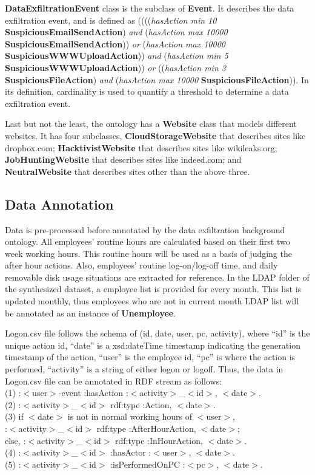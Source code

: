 \textbf{DataExfiltrationEvent} class is the subclass of \textbf{Event}. 
It describes the data exfiltration event, and is defined as ((((\textit{hasAction min 10} \textbf{SuspiciousEmailSendAction}) \textit{and} (\textit{hasAction max 10000} \textbf{SuspiciousEmailSendAction})) \textit{or} (\textit{hasAction max 10000} \textbf{SuspiciousWWWUploadAction})) \textit{and} (\textit{hasAction min 5} \textbf{SuspiciousWWWUploadAction})) \textit{or} ((\textit{hasAction min 3} \textbf{SuspiciousFileAction}) \textit{and} (\textit{hasAction max 10000} \textbf{SuspiciousFileAction})).
In its definition, cardinality is used to quantify a threshold to determine a data exfiltration event.

Last but not the least, the ontology has a \textbf{Website} class that models different websites. 
It has four subclasses, \textbf{CloudStorageWebsite} that describes sites like dropbox.com; 
\textbf{HacktivistWebsite} that describes sites like wikileaks.org;
\textbf{JobHuntingWebsite} that describes sites like indeed.com;
and \textbf{NeutralWebsite} that describes sites other than the above three. 

\subsection{Data Annotation}
Data is pre-processed before annotated by the data exfiltration background ontology. 
All employees' routine hours are calculated based on their first two week working hours. 
This routine hours will be used as a basis of judging the after hour actions. 
Also, employees' routine log-on/log-off time, and daily removable disk usage situations are extracted for reference. 
In the LDAP folder of the synthesized dataset, a employee list is provided for every month.
This list is updated monthly, thus employees who are not in current month LDAP list will be annotated as an instance of \textbf{Unemployee}.

Logon.csv file follows the schema of (id, date, user, pc, activity), where ``id'' is the unique action id, ``date'' is a xsd:dateTime timestamp indicating the generation timestamp of the action, ``user'' is the employee id, ``pc'' is where the action is performed, ``activity'' is a string of either logon or logoff. 
Thus, the data in Logon.csv file can be annotated in RDF stream as follows: \\
(1) :$<$user$>$-event :hasAction :$<$activity$>$\_$<$id$>$, $<$date$>$. \\
(2) :$<$activity$>$\_$<$id$>$ rdf:type :Action, $<$date$>$. \\
(3) if $<$date$>$ is not in normal working hours of $<$user$>$, \\
:$<$activity$>$\_$<$id$>$ rdf:type :AfterHourAction, $<$date$>$; \\ 
else, :$<$activity$>$\_$<$id$>$ rdf:type :InHourAction, $<$date$>$. \\
(4) :$<$activity$>$\_$<$id$>$ :hasActor :$<$user$>$, $<$date$>$.  \\
(5) :$<$activity$>$\_$<$id$>$ :isPerformedOnPC :$<$pc$>$, $<$date$>$. 

